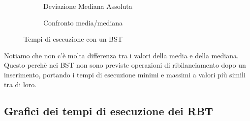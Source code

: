 \documentclass[a4paper,titlepage]{article}
\begin{document}
\begin{figure}[h]
  \centering
  \begin{subfigure}{\textwidth}
     \captionsetup{justification=centering}
     \caption{Deviazione Mediana Assoluta}
     \label{fig:bst_mad}
  \end{subfigure}%
  \vspace{2pt}
  \begin{subfigure}{\textwidth}
     \captionsetup{justification=centering}
     \caption{Confronto media/mediana}
     \label{fig:bst_mean_median}
  \end{subfigure}
  \caption{Tempi di esecuzione con un BST}
\end{figure}

Notiamo che non c'è molta differenza tra i valori della media e della mediana.
Questo perchè nei BST non sono previste operazioni di ribilanciamento dopo un inserimento, portando i tempi di esecuzione minimi e massimi a valori più simili tra di loro.
\newpage

\subsection{Grafici dei tempi di esecuzione dei RBT }
\end{document}
